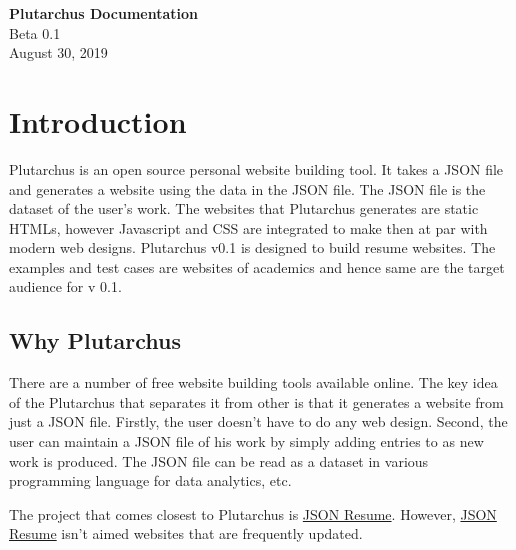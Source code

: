 \documentclass[12pt]{article}
\newcommand{\blank}[1]{\hspace*{#1}\linebreak[0]}
\begin{document}
\begin{titlepage}
    \begin{center}
        \vspace*{1cm}
        \Huge
        \textbf{Plutarchus Documentation}
        \\
        \LARGE
        \vspace{0.5cm}
         Beta 0.1
         \\
        \vspace{1.5cm}
        \vspace{8.5cm}
        \vspace{1cm}
        \hspace{2cm}
        \blank{6cm} August 30, 2019
    \end{center}
 \end{titlepage}
 
    \tableofcontents
    \newpage
    \section{Introduction}

    Plutarchus is an open source personal website building tool. It takes a JSON file and generates a website using the data in the JSON file. The JSON file is the dataset of the user's work. The websites that Plutarchus generates are static HTMLs, however Javascript and CSS are integrated to make then at par with modern web designs. Plutarchus v0.1 is designed to build resume websites. The examples and test cases are websites of academics and hence same are the target audience for v 0.1.

 
    \subsection{Why Plutarchus}

    There are a number of free website building tools available online. The key idea of the Plutarchus that separates it from other is that it generates a website from just a JSON file. Firstly, the user doesn't have to do any web design. Second, the user can maintain a JSON file of his work by simply adding entries to as new work is produced. The JSON file can be read as a dataset in various programming language for data analytics, etc. 

    The project that comes closest to Plutarchus is \href{http://jsonresume.org/}{JSON Resume}.
    However, \href{http://jsonresume.org/}{JSON Resume} isn't aimed websites that are frequently updated.   
\end{document}
